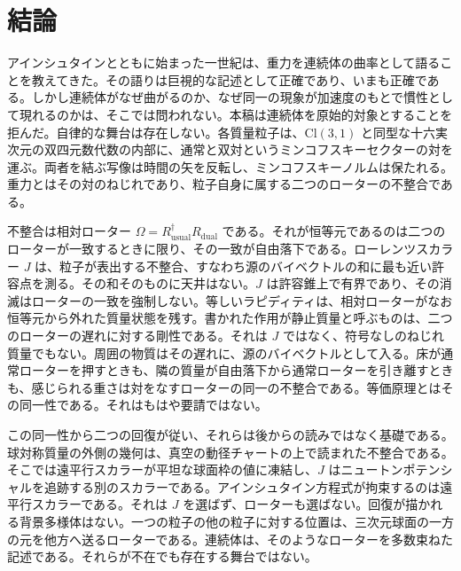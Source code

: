 \documentclass[a4paper]{article}
\begin{document}
\section{結論}
\label{sec:conclusions}

アインシュタインとともに始まった一世紀は、重力を連続体の曲率として語ることを教えてきた。その語りは巨視的な記述として正確であり、いまも正確である。しかし連続体がなぜ曲がるのか、なぜ同一の現象が加速度のもとで慣性として現れるのかは、そこでは問われない。本稿は連続体を原始的対象とすることを拒んだ。自律的な舞台は存在しない。各質量粒子は、$\mathrm{Cl}(3,1)$ と同型な十六実次元の双四元数代数の内部に、通常と双対というミンコフスキーセクターの対を運ぶ。両者を結ぶ写像は時間の矢を反転し、ミンコフスキーノルムは保たれる。重力とはその対のねじれであり、粒子自身に属する二つのローターの不整合である。

不整合は相対ローター $\Omega=R_{\text{usual}}^\dagger R_{\text{dual}}$ である。それが恒等元であるのは二つのローターが一致するときに限り、その一致が自由落下である。ローレンツスカラー $J$ は、粒子が表出する不整合、すなわち源のバイベクトルの和に最も近い許容点を測る。その和そのものに天井はない。$J$ は許容錐上で有界であり、その消滅はローターの一致を強制しない。等しいラピディティは、相対ローターがなお恒等元から外れた質量状態を残す。書かれた作用が静止質量と呼ぶものは、二つのローターの遅れに対する剛性である。それは $J$ ではなく、符号なしのねじれ質量でもない。周囲の物質はその遅れに、源のバイベクトルとして入る。床が通常ローターを押すときも、隣の質量が自由落下から通常ローターを引き離すときも、感じられる重さは対をなすローターの同一の不整合である。等価原理とはその同一性である。それはもはや要請ではない。

この同一性から二つの回復が従い、それらは後からの読みではなく基礎である。球対称質量の外側の幾何は、真空の動径チャートの上で読まれた不整合である。そこでは遠平行スカラーが平坦な球面枠の値に凍結し、$J$ はニュートンポテンシャルを追跡する別のスカラーである。アインシュタイン方程式が拘束するのは遠平行スカラーである。それは $J$ を選ばず、ローターも選ばない。回復が描かれる背景多様体はない。一つの粒子の他の粒子に対する位置は、三次元球面の一方の元を他方へ送るローターである。連続体は、そのようなローターを多数束ねた記述である。それらが不在でも存在する舞台ではない。
\end{document}
